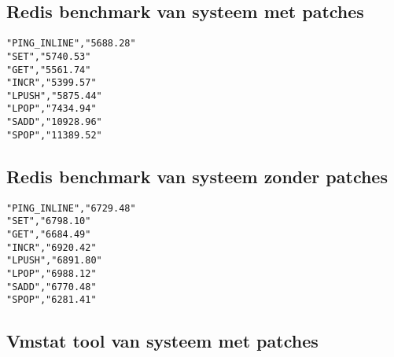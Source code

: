 \subsection{Redis benchmark van systeem met patches}

\begin{lstlisting}
"PING_INLINE","5688.28"
"SET","5740.53"
"GET","5561.74"
"INCR","5399.57"
"LPUSH","5875.44"
"LPOP","7434.94"
"SADD","10928.96"
"SPOP","11389.52"

\end{lstlisting}

\subsection{Redis benchmark van systeem zonder patches}

\begin{lstlisting}
"PING_INLINE","6729.48"
"SET","6798.10"
"GET","6684.49"
"INCR","6920.42"
"LPUSH","6891.80"
"LPOP","6988.12"
"SADD","6770.48"
"SPOP","6281.41"

\end{lstlisting}

\newpage
\subsection{Vmstat tool van systeem met patches}



